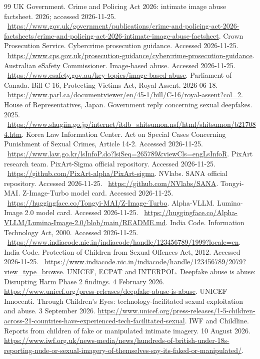 \documentclass[10pt,a4paper]{article}
\begin{document}
\begin{thebibliography}{99}
 UK Government. Crime and Policing Act 2026: intimate image abuse factsheet. 2026; accessed 2026-11-25. \ \url{https://www.gov.uk/government/publications/crime-and-policing-act-2026-factsheets/crime-and-policing-act-2026-intimate-image-abuse-factsheet}.
 Crown Prosecution Service. Cybercrime prosecution guidance. Accessed 2026-11-25. \ \url{https://www.cps.gov.uk/prosecution-guidance/cybercrime-prosecution-guidance}.
 Australian eSafety Commissioner. Image-based abuse. Accessed 2026-11-25. \ \url{https://www.esafety.gov.au/key-topics/image-based-abuse}.
 Parliament of Canada. Bill C-16, Protecting Victims Act, Royal Assent. 2026-06-18. \ \url{https://www.parl.ca/documentviewer/en/45-1/bill/C-16/royal-assent?col=2}.
 House of Representatives, Japan. Government reply concerning sexual deepfakes. 2025. \ \url{https://www.shugiin.go.jp/internet/itdb_shitsumon.nsf/html/shitsumon/b217084.htm}.
 Korea Law Information Center. Act on Special Cases Concerning Punishment of Sexual Crimes, Article 14-2. Accessed 2026-11-25. \ \url{https://www.law.go.kr/lsInfoP.do?lsiSeq=265789&viewCls=engLsInfoR}.
 PixArt research team. PixArt-Sigma official repository. Accessed 2026-11-25. \ \url{https://github.com/PixArt-alpha/PixArt-sigma}.
 NVlabs. SANA official repository. Accessed 2026-11-25. \ \url{https://github.com/NVlabs/SANA}.
 Tongyi-MAI. Z-Image-Turbo model card. Accessed 2026-11-25. \ \url{https://huggingface.co/Tongyi-MAI/Z-Image-Turbo}.
 Alpha-VLLM. Lumina-Image 2.0 model card. Accessed 2026-11-25. \ \url{https://huggingface.co/Alpha-VLLM/Lumina-Image-2.0/blob/main/README.md}.
 India Code. Information Technology Act, 2000. Accessed 2026-11-25. \ \url{https://www.indiacode.nic.in/indiacode/handle/123456789/1999?locale=en}.
 India Code. Protection of Children from Sexual Offences Act, 2012. Accessed 2026-11-25. \ \url{https://www.indiacode.nic.in/indiacode/handle/123456789/2079?view_type=browse}.
 UNICEF, ECPAT and INTERPOL. Deepfake abuse is abuse: Disrupting Harm Phase 2 findings. 4 February 2026. \url{https://www.unicef.org/press-releases/deepfake-abuse-is-abuse}.
 UNICEF Innocenti. Through Children's Eyes: technology-facilitated sexual exploitation and abuse. 3 September 2026. \url{https://www.unicef.org/press-releases/1-5-children-across-21-countries-have-experienced-tech-facilitated-sexual}.
 IWF and Childline. Reports from children of fake or manipulated intimate imagery. 10 August 2026. \url{https://www.iwf.org.uk/news-media/news/hundreds-of-british-under-18s-reporting-nude-or-sexual-imagery-of-themselves-say-its-faked-or-manipulated/}.

\end{thebibliography}
\end{document}
